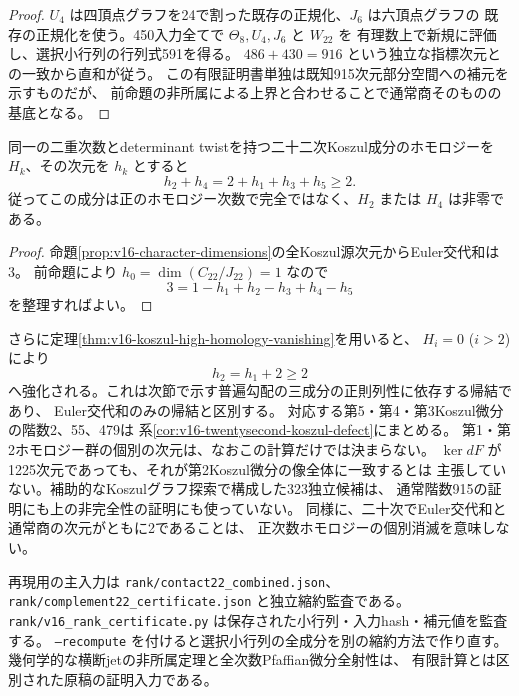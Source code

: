 \begin{proof}
$U_4$ は四頂点グラフを24で割った既存の正規化、$J_6$ は六頂点グラフの
既存の正規化を使う。450入力全てで $\Theta_8,U_4,J_6$ と $W_{22}$ を
有理数上で新規に評価し、選択小行列の行列式591を得る。
$486+430=916$ という独立な指標次元との一致から直和が従う。
この有限証明書単独は既知915次元部分空間への補元を示すものだが、
前命題の非所属による上界と合わせることで通常商そのものの基底となる。
\end{proof}

\begin{corollary}[二十二次の正次数Koszulホモロジー]
\label{cor:v16-positive-koszul-homology}
同一の二重次数とdeterminant twistを持つ二十二次Koszul成分のホモロジーを
$H_k$、その次元を $h_k$ とすると
\[
 h_2+h_4=2+h_1+h_3+h_5\geq2.
\]
従ってこの成分は正のホモロジー次数で完全ではなく、$H_2$ または $H_4$ は非零である。
\end{corollary}

\begin{proof}
命題\ref{prop:v16-character-dimensions}の全Koszul源次元からEuler交代和は3。
前命題により $h_0=\dim(C_{22}/J_{22})=1$ なので
\[
 3=1-h_1+h_2-h_3+h_4-h_5
\]
を整理すればよい。
\end{proof}

さらに定理\ref{thm:v16-koszul-high-homology-vanishing}を用いると、
$H_i=0$ ($i>2$) により
\[
 h_2=h_1+2\geq2
\]
へ強化される。これは次節で示す普遍勾配の三成分の正則列性に依存する帰結であり、
Euler交代和のみの帰結と区別する。
対応する第5・第4・第3Koszul微分の階数2、55、479は
系\ref{cor:v16-twentysecond-koszul-defect}にまとめる。
第1・第2ホモロジー群の個別の次元は、なおこの計算だけでは決まらない。
$\ker dF$ が1225次元であっても、それが第2Koszul微分の像全体に一致するとは
主張していない。補助的なKoszulグラフ探索で構成した323独立候補は、
通常階数915の証明にも上の非完全性の証明にも使っていない。
同様に、二十次でEuler交代和と通常商の次元がともに2であることは、
正次数ホモロジーの個別消滅を意味しない。

再現用の主入力は \texttt{rank/contact22\_combined.json}、
\texttt{rank/complement22\_certificate.json} と独立縮約監査である。
\texttt{rank/v16\_rank\_certificate.py} は保存された小行列・入力hash・補元値を監査する。
\texttt{--recompute} を付けると選択小行列の全成分を別の縮約方法で作り直す。
幾何学的な横断jetの非所属定理と全次数Pfaffian微分全射性は、
有限計算とは区別された原稿の証明入力である。




